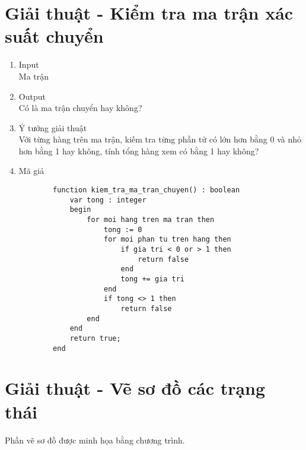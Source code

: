 \section{Giải thuật - Kiểm tra ma trận xác suất chuyển}
	\begin{enumerate}
  		\item Input \\
  			Ma trận
  		\item Output \\
  			Có là ma trận chuyển hay không?
  		\item Ý tưởng giải thuật \\
  			Với từng hàng trên ma trận, kiếm tra từng phần tử có lớn hơn bằng 0 và nhỏ hơn bằng 1 hay không, 				tính tổng hàng xem có bằng 1 hay không?
  		\item Mã giả
  			\begin{lstlisting}
  		function kiem_tra_ma_tran_chuyen() : boolean
			var tong : integer
			begin	
				for moi hang tren ma tran then
					tong := 0
					for moi phan tu tren hang then
						if gia tri < 0 or > 1 then
							return false
						end
						tong += gia tri
					end
					if tong <> 1 then
						return false
				end
			end
			return true;
		end
  			\end{lstlisting}	
	\end{enumerate}



\section{Giải thuật - Vẽ sơ đồ các trạng thái}
	Phần vẽ sơ đồ được minh họa bằng chương trình.



